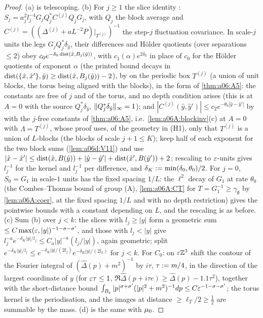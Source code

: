 \begin{proof}
(a) is telescoping. (b) For $j\ge1$ the slice identity \cite[(1.27)]{Ba3}: $S_j=a_j^2l_j^{-4}G_jQ_j^*C^{(j)}Q_jG_j$, with $Q_j$ the block average and $C^{(j)}=((\Delta^{(j)}+aL^{-2}P)|_{T^{(j)}})^{-1}$ the step-$j$ fluctuation covariance. In scale-$j$ units the legs $G_jQ_j^*\delta_{\hat y}$, their differences and H\"older quotients (over separations $\le2$) obey $c_0e^{-\delta_0\operatorname{dist}(\hat x,B_j(\hat y))}$, with $c_1(\alpha)e^{2\delta_0}$ in place of $c_0$ for the H\"older quotients of exponent $\alpha$ (the printed bound decays in $\operatorname{dist}(\{\hat x,\hat x'\},\hat y)\ge\operatorname{dist}(\hat x,B_j(\hat y))-2$), by \cite[Lemma~2.4, (2.35)--(2.36)]{Ba4} on the periodic box $T^{(j)}$ (a union of unit blocks, the torus being aligned with the blocks), in the form of \cref{thm:a06:A5}: the constants are free of $j$ and of the torus, and no depth condition arises (this is \cite[Prop.~2.1, (2.24)--(2.25)]{Ba1} at $A=0$ with the source $Q_j^*\delta_{\hat y}$, $\lVert Q_j^*\delta_{\hat y}\rVert_\infty=1$); and $|C^{(j)}(\hat y,\hat y')|\le c_2e^{-\theta_0|\hat y-\hat y'|}$ by \cite[(2.37)]{Ba4} with the $j$-free constants of \cref{thm:a06:A5}, i.e.\ \cref{lem:a06A:blockinv}(c) at $A=0$ with $\Lambda=T^{(j)}$, whose proof uses, of the geometry in (H1), only that $T^{(j)}$ is a union of $L$-blocks (the blocks of scale $j+1\le K$); keep half of each exponent for the two block sums (\cref{lem:a06d:V11}) and use $|\hat x-\hat x'|\le\operatorname{dist}(\hat x,B(\hat y))+|\hat y-\hat y'|+\operatorname{dist}(\hat x',B(\hat y'))+2$; rescaling to $\varepsilon$-units gives $l_j^{-1}$ for the kernel and $l_j^{-1}$ per difference, and $\delta_K:=\min(\delta_0,\theta_0)/2$. For $j=0$, $S_0=G_1$ in scale-$1$ units has the fixed spacing $1/L$: the $\ell^2$ decay of $G_1$ at rate $\theta_0$ (the Combes--Thomas bound of group (A), \cref{lem:a06A:CT} for $T=G_1^{-1}\ge\gamma_\emptyset$ by \cref{lem:a06A:coer}, at the fixed spacing $1/L$ and with no depth restriction) gives the pointwise bounds with a constant depending on $L$, and the rescaling is as before. (c) Sum (b) over $j<k$: the slices with $l_j\ge|y|$ form a geometric sum $\le C\max(\varepsilon,|y|)^{-1-\sigma-\sigma'}$, and those with $l_j<|y|$ give $l_j^{-a}e^{-\delta_K|y|/l_j}\le C_a|y|^{-a}(l_j/|y|)$, again geometric; split $e^{-\delta_K|y|/l_j}\le e^{-\delta_K|y|/(2l_j)}e^{-\delta_K|y|/(2l_k)}$ for $j<k$. For $C_0$: on $\varepsilon\mathbb Z^3$ shift the contour of the Fourier integral of $(\hat\Delta(p)+m^2)^{-1}$ by $i\tau$, $\tau:= m/4$, in the direction of the largest coordinate of $y$ (for $\varepsilon\tau\le1$, $\Re\hat\Delta(p+i\tau e)\ge\hat\Delta(p)-1.1\tau^2$), together with the short-distance bound $\int_{B_{\varepsilon}}|p|^{\sigma+\sigma'}(|p|^2+m^2)^{-1}dp\le C\varepsilon^{-1-\sigma-\sigma'}$; the torus kernel is the periodisation, and the images at distance $\ge\ell_T/2\ge\frac12$ are summable by the mass. (d) is the same with $\mu_0$.
\end{proof}

